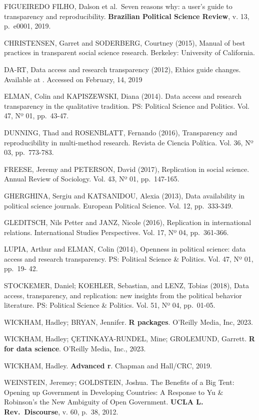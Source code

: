 \documentclass{article}
\begin{document}
FIGUEIREDO FILHO, Dalson et al.~Seven reasons why: a user's guide to
transparency and reproducibility. \textbf{Brazilian Political Science
Review}, v. 13, p.~e0001, 2019.

CHRISTENSEN, Garret and SODERBERG, Courtney (2015), Manual of best
practices in transparent social science research. Berkeley: University
of California.

DA-RT, Data access and research transparency (2012), Ethics guide
changes. Available at . Accessed on February, 14, 2019

ELMAN, Colin and KAPISZEWSKI, Diana (2014). Data access and research
transparency in the qualitative tradition. PS: Political Science and
Politics. Vol. 47, Nº 01, pp.~43-47.

DUNNING, Thad and ROSENBLATT, Fernando (2016), Transparency and
reproducibility in multi-method research. Revista de Ciencia Política.
Vol. 36, Nº 03, pp.~773-783.

FREESE, Jeremy and PETERSON, David (2017), Replication in social
science. Annual Review of Sociology. Vol. 43, Nº 01, pp.~147-165.

GHERGHINA, Sergiu and KATSANIDOU, Alexia (2013), Data availability in
political science journals. European Political Science. Vol. 12,
pp.~333-349.

GLEDITSCH, Nils Petter and JANZ, Nicole (2016), Replication in
international relations. International Studies Perspectives. Vol. 17, Nº
04, pp.~361-366.

LUPIA, Arthur and ELMAN, Colin (2014), Openness in political science:
data access and research transparency. PS: Political Science \&
Politics. Vol. 47, Nº 01, pp.~19- 42.

STOCKEMER, Daniel; KOEHLER, Sebastian, and LENZ, Tobias (2018), Data
access, transparency, and replication: new insights from the political
behavior literature. PS: Political Science \& Politics. Vol. 51, Nº 04,
pp.~01-05.

WICKHAM, Hadley; BRYAN, Jennifer. \textbf{R packages}. O'Reilly Media,
Inc, 2023.

WICKHAM, Hadley; ÇETINKAYA-RUNDEL, Mine; GROLEMUND, Garrett. \textbf{R
for data science}. O'Reilly Media, Inc., 2023.

WICKHAM, Hadley. \textbf{Advanced r}. Chapman and Hall/CRC, 2019.

WEINSTEIN, Jeremey; GOLDSTEIN, Joshua. The Benefits of a Big Tent:
Opening up Government in Developing Countries: A Response to Yu \&
Robinson's the New Ambiguity of Open Government. \textbf{UCLA L.
Rev.~Discourse}, v. 60, p.~38, 2012.
\end{document}
